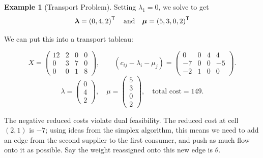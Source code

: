 \documentclass[11pt]{article}
\theoremstyle{definition}
\newtheorem{example}[theorem]{Example}
\theoremstyle{remark}
\newcommand{\pqty}[1]{\left(#1\right)}
\newcommand{\transpose}{^{\mathsf{T}}}
\newcommand{\qand}{\quad\text{and}\quad}
\begin{document}
\begin{example}[Transport Problem]
    Setting \(\lambda_1 = 0\), we solve to get
    \[
        \vb*{\lambda} = \pqty{0, 4, 2}\transpose \qand \vb*{\mu} = \pqty{5, 3, 0, 2}\transpose
    \]

    We can put this into a transport tableau:
    
\[X=\begin{pmatrix}12&2&0&0\\0&3&7&0\\0&0&1&8\end{pmatrix},\qquad (c_{ij}-\lambda_i-\mu_j)=\begin{pmatrix}0&0&4&4\\-7&0&0&-5\\-2&1&0&0\end{pmatrix}.\]
\[\lambda=\begin{pmatrix}0\\4\\2\end{pmatrix},\quad\mu=\begin{pmatrix}5\\3\\0\\2\end{pmatrix},\quad\text{total cost}=149.\]


    The negative reduced costs violate dual feasibility. The reduced cost at cell \((2,1)\) is \(-7\); using ideas from the simplex algorithm, this means we need to add an edge from the second supplier to the first consumer, and push as much flow onto it as possible. Say the weight reassigned onto this new edge is \(\theta\).

    \begin{center}
\end{center}
\end{example}
\end{document}

